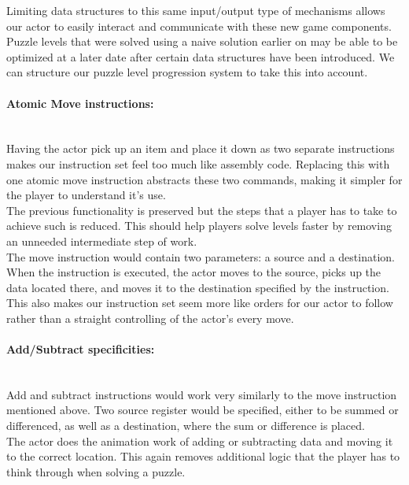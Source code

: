Limiting data structures to this same input/output type of mechanisms allows our
actor to easily interact and communicate with these new game components.\\

Puzzle levels that were solved using a naive solution earlier on may be able to be
optimized at a later date after certain data structures have been introduced. We can
structure our puzzle level progression system to take this into account.\\

\paragraph{Atomic Move instructions:}\mbox{} \\
Having the actor pick up an item and place it down as two separate instructions
makes our instruction set feel too much like assembly code. Replacing this with one
atomic move instruction abstracts these two commands, making it simpler for the player
to understand it's use.\\

The previous functionality is preserved but the steps that a player has to take to achieve
such is reduced. This should help players solve levels faster by removing an unneeded
intermediate step of work.\\

The move instruction would contain two parameters: a source and a destination. When the
instruction is executed, the actor moves to the source, picks up the data located there, and moves
it to the destination specified by the instruction. This also makes our instruction set seem
more like orders for our actor to follow rather than a straight controlling of the actor's
every move.\\

\paragraph{Add/Subtract specificities:}\mbox{} \\
Add and subtract instructions would work very similarly to the move instruction
mentioned above. Two source register would be specified, either to be summed or differenced,
as well as a destination, where the sum or difference is placed.\\

The actor does the animation work of adding or subtracting data and moving it to the correct
location. This again removes additional logic that the player has to think through when
solving a puzzle.\\

